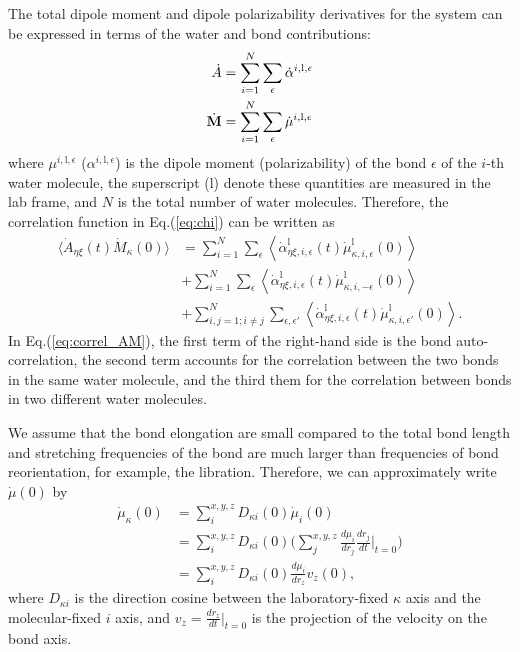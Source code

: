  The total dipole moment and dipole polarizability derivatives for the system can be expressed in terms of the water and bond contributions:
\begin{align}
 \dot{A}&=\sum_{i=1}^N \sum_{\epsilon}\dot{\alpha}^{i,\text{l},\epsilon} \\ 
 \dot{{\bf M}}&=\sum_{i=1}^N \sum_{\epsilon}\dot{\mu}^{i,\text{l},\epsilon} 
 \label{eq:A-M}
\end{align}
where ${\mu}^{i,\text{l},\epsilon}$ (${\alpha}^{i,\text{l},\epsilon}$) is the dipole moment (polarizability)
of the bond $\epsilon$ of the $i$-th water molecule, the superscript (l) denote these quantities are measured in the 
lab frame, and $N$ is the total number of water molecules.
Therefore, the correlation function in Eq.\thinspace(\ref{eq:chi}) can be written as 
\begin{align}
  \langle\dot{A}_{\eta\xi}(t)\dot{M}_{\kappa}(0)\rangle 
    &=\sum_{i=1}^N \sum_{\epsilon}\left\langle\dot{\alpha}_{\eta\xi,i,\epsilon}^{\text{l}}(t)\dot{\mu}_{\kappa,i,\epsilon}^{\text{l}}(0)\right\rangle \nonumber \\ 
    &+\sum_{i=1}^N \sum_{\epsilon}\left\langle\dot{\alpha}_{\eta\xi,i,\epsilon}^{\text{l}}(t)\dot{\mu}_{\kappa,i,-\epsilon}^{\text{l}}(0)\right\rangle \nonumber \\
    &+\sum_{i,j=1;i\neq j}^N \sum_{\epsilon,\epsilon'}\left\langle\dot{\alpha}_{\eta\xi,i,\epsilon}^{\text{l}}(t)\dot{\mu}_{\kappa,i,\epsilon'}^{\text{l}}(0)\right\rangle.
 \label{eq:correl_AM}
 \end{align}
In Eq.\thinspace(\ref{eq:correl_AM}), the first term of the right-hand side is the bond auto-correlation, the second term accounts 
for the correlation between the two bonds in the same water molecule, and the third them for the correlation between 
bonds in two different water molecules.
 
We assume that the bond elongation are small compared to the total bond length and stretching frequencies of the bond are 
much larger than frequencies of bond reorientation, for example, the libration.
Therefore, we can approximately write ${\dot\mu}(0)$ by 
\begin{align}
    \dot\mu_{\kappa}(0)&=\sum_i^{x,y,z}{{D}}_{\kappa i}(0)\dot{\mu}_i(0) \nonumber \\
                       &=\sum_i^{x,y,z}{{D}}_{\kappa i}(0)\biggl(\sum_j^{x,y,z}\frac{d\mu_i}{d r_j}\frac{d{r}_j}{dt}|_{t=0}\biggr) \nonumber \\
                       &=\sum_{i}^{x,y,z}{{D}}_{\kappa i}(0)\frac{d\mu_i}{dr_z}v_z(0),
    \label{eq:dot_mu}
 \end{align}
where ${D}_{\kappa i}$ is the direction cosine between the laboratory-fixed $\kappa$ axis and the molecular-fixed $i$ axis,
and $v_z=\frac{d{r}_z}{dt}|_{t=0}$ is the projection of the velocity on the bond axis.

